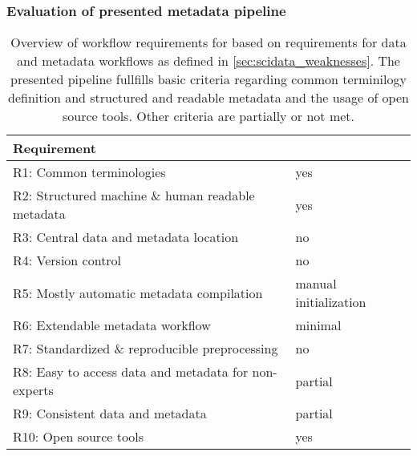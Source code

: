 \subsubsection{Evaluation of presented metadata pipeline}
\begin{table}[]
\begin{tabular}{|l|l|}
\hline
Requirement                                          &  \cite{Brochier_2018} \\  \hline
R1: Common terminologies                             &  yes \\ \hline
R2: Structured machine \& human readable metadata    &  yes \\ \hline
R3: Central data and metadata location               &  no \\ \hline
R4: Version control                                  &  no \\ \hline
R5: Mostly automatic metadata compilation            &  manual initialization \\ \hline
R6: Extendable metadata workflow                     &  minimal \\ \hline
R7: Standardized \& reproducible preprocessing       &  no \\ \hline
R8: Easy to access data and metadata for non-experts &  partial \\ \hline
R9: Consistent data and metadata                     &  partial \\ \hline
R10: Open source tools                               &  yes \\ \hline
\end{tabular}
\caption[Overview of workflow requirements for \cite{Brochier_2018}]{Overview of workflow requirements for \cite{Brochier_2018} based on requirements for data and metadata workflows as defined in \ref{sec:scidata_weaknesses}. The presented pipeline fullfills basic criteria regarding common terminilogy definition and structured and readable metadata and the usage of open source tools. Other criteria are partially or not met.}
\label{tab:requirement_check_brochier}
\end{table}



% 
